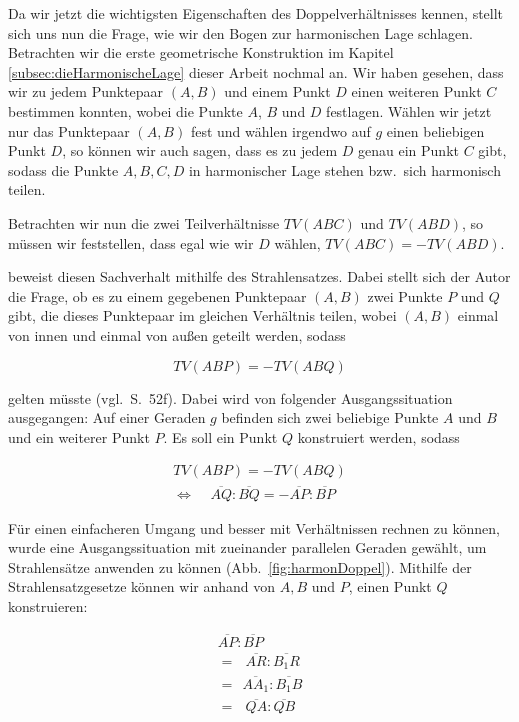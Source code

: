 \documentclass[12pt,a4paper]{article}
\begin{document}
Da wir jetzt die wichtigsten Eigenschaften des Doppelverhältnisses kennen, stellt sich uns nun die Frage, wie wir den Bogen zur harmonischen Lage schlagen. Betrachten wir die erste geometrische Konstruktion im Kapitel \ref{subsec:dieHarmonischeLage} dieser Arbeit nochmal an. Wir haben gesehen, dass wir zu jedem Punktepaar $(A, B)$ und einem Punkt $D$ einen weiteren Punkt $C$ bestimmen konnten, wobei die Punkte $A$, $B$ und $D$ festlagen. Wählen wir jetzt nur das Punktepaar $(A, B)$ fest und wählen irgendwo auf $g$ einen beliebigen Punkt $D$, so können wir auch sagen, dass es zu jedem $D$ genau ein Punkt $C$ gibt, sodass die Punkte $A, B, C, D$ in harmonischer Lage stehen bzw.~sich harmonisch teilen.

Betrachten wir nun die zwei Teilverhältnisse $TV(A B C)$ und $TV(A B D)$, so müssen wir feststellen, dass egal wie wir $D$ wählen, $TV(A B C) = -TV(A B D)$.

\citep{projektiveGeometrie} beweist diesen Sachverhalt mithilfe des Strahlensatzes. Dabei stellt sich der Autor die Frage, ob es zu einem gegebenen Punktepaar $(A, B)$ zwei Punkte $P$ und $Q$ gibt, die dieses Punktepaar im gleichen Verhältnis teilen, wobei $(A,  B)$ einmal von innen und einmal von außen geteilt werden, sodass

\[TV(A B P) = -TV(A B Q)\]

gelten müsste (vgl.~S.~52f). Dabei wird von folgender Ausgangssituation ausgegangen: Auf einer Geraden $g$ befinden sich zwei beliebige Punkte $A$ und $B$ und ein weiterer Punkt $P$. Es soll ein Punkt $Q$ konstruiert werden, sodass 

\begin{equation*}
\begin{split}
TV(A B P) = -TV(A B Q) \\
\Longleftrightarrow ~~~~~\overline{A Q} : \overline{B Q} = -\overline{A P} : \overline{B P}~~
\end{split}
\end{equation*}

Für einen einfacheren Umgang und besser mit Verhältnissen rechnen zu können, wurde eine Ausgangssituation mit zueinander parallelen Geraden gewählt, um Strahlensätze anwenden zu können (Abb.~\ref{fig:harmonDoppel}). Mithilfe der Strahlensatzgesetze können wir anhand von $A, B$ und $P$, einen Punkt $Q$ konstruieren:

\begin{equation*}
\begin{split}
  \overline{A P} : \overline{B P}~ \\
=~~~\overline{A R} : \overline{B_1 R}  \\
=~~\overline{A A_1} : \overline{B_1 B}  \\
=~~~\overline{Q A} : \overline{Q B}~
\end{split}
\end{equation*}
\end{document}
